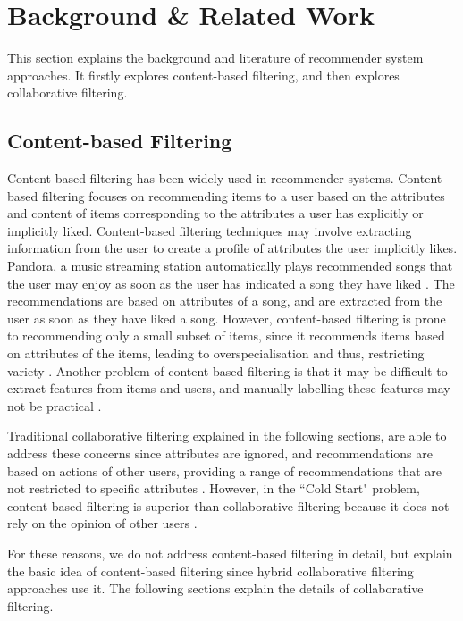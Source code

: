 \chapter{Background \& Related Work}\label{C:background}

This section explains the background and literature of recommender system approaches. It firstly explores content-based filtering, and then explores collaborative filtering.

\section{Content-based Filtering}
Content-based filtering has been widely used in recommender systems. Content-based filtering focuses on recommending items to a user based on the attributes and content of items corresponding to the attributes a user has explicitly or implicitly liked. Content-based filtering techniques may involve extracting information from the user to create a profile of attributes the user implicitly likes. Pandora, a music streaming station automatically plays recommended songs that the user may enjoy as soon as the user has indicated a song they have liked . The recommendations are based on  attributes of a song, and are extracted from the user as soon as they have liked a song. However, content-based filtering is prone to recommending only a small subset of items, since it recommends items based on attributes of the items, leading to overspecialisation and thus, restricting variety \cite{toward}. Another problem of content-based filtering is that it may be difficult to extract features from items and users, and manually labelling these features may not be practical \cite{toward}.

Traditional collaborative filtering explained in the following sections, are able to address these concerns since attributes are ignored, and recommendations are based on actions of other users, providing a range of recommendations that are not restricted to specific attributes \cite{koren2009matrix}. However, in the ``Cold Start" problem, content-based filtering is superior than collaborative filtering because it does not rely on the opinion of other users \cite{koren2009matrix}.

For these reasons, we do not address content-based filtering in detail, but explain the basic idea of content-based filtering since hybrid collaborative filtering approaches use it. The following sections explain the details of collaborative filtering.  

